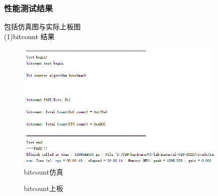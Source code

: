 \subsubsection{性能测试结果}
\textcolor{black}{包括仿真图与实际上板图}\\
\textcolor{black}{(1)bitcount 结果}\\
\begin{figure}[h]
    \centering
    \includegraphics[width=0.9\textwidth]{image/bitcountS.png}
    \caption{bitcount仿真}
\end{figure}

\begin{figure}[h]
    \centering
    \caption{bitcount上板}
\end{figure}

